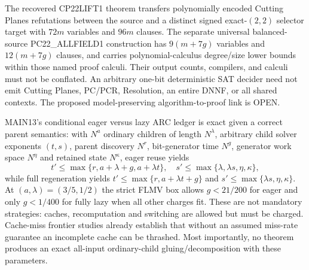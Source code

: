 \documentclass[11pt]{article}
\begin{document}
The recovered CP22LIFT1 theorem transfers polynomially encoded Cutting Planes refutations between the source and a distinct signed exact-$(2,2)$ selector target with $72m$ variables and $96m$ clauses. The separate universal balanced-source PC22\_ALLFIELD1 construction has $9(m+7g)$ variables and $12(m+7g)$ clauses, and carries polynomial-calculus degree/size lower bounds within those named proof calculi. Their output counts, compilers, and calculi must not be conflated. An arbitrary one-bit deterministic SAT decider need not emit Cutting Planes, PC/PCR, Resolution, an entire DNNF, or all shared contexts. The proposed model-preserving algorithm-to-proof link is OPEN.

MAIN13's conditional eager versus lazy ARC ledger is exact given a correct parent semantics: with $N^a$ ordinary children of length $N^\lambda$, arbitrary child solver exponents $(t,s)$, parent discovery $N^r$, bit-generator time $N^g$, generator work space $N^\eta$ and retained state $N^\kappa$, eager reuse yields
\[
t'\le\max\{r,a+\lambda+g,a+\lambda t\},
\quad s'\le\max\{\lambda,\lambda s,\eta,\kappa\},
\]
while full regeneration yields $t'\le\max\{r,a+\lambda t+g\}$ and $s'\le\max\{\lambda s,\eta,\kappa\}$. At $(a,\lambda)=(3/5,1/2)$ the strict FLMV box allows $g<21/200$ for eager and only $g<1/400$ for fully lazy when all other charges fit. These are not mandatory strategies: caches, recomputation and switching are allowed but must be charged. Cache-miss frontier studies already establish that without an assumed miss-rate guarantee an incomplete cache can be thrashed. Most importantly, no theorem produces an exact all-input ordinary-child gluing/decomposition with these parameters.
\end{document}
